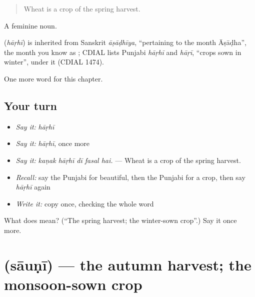 \begin{quote}
Wheat is a crop of the spring harvest.
\end{quote}

A feminine noun.

\begin{cousinweb}
\textbf{} (\emph{hāṛhī}) is inherited from Sanskrit \emph{āṣāḍhīya}, \textquotedblleft{}pertaining to the month Āṣāḍha\textquotedblright{}, the month you know as ; CDIAL lists Punjabi \emph{hāṛhī} and \emph{hāṛī}, \textquotedblleft{}crops sown in winter\textquotedblright{}, under it (CDIAL 1474).
\end{cousinweb}

\begin{grammarlens}[title={What you've built}]
One more word for this chapter.
\end{grammarlens}

\subsection*{Your turn}
\begin{itemize}
\raggedright
  \item \emph{Say it:} \emph{hāṛhī}
  \item \emph{Say it:} \emph{hāṛhī}, once more
  \item \emph{Say it:} \emph{kaṇak hāṛhī dī fasal hai.} — Wheat is a crop of the spring harvest.
  \item \emph{Recall:} say the Punjabi for beautiful, then the Punjabi for a crop, then say \emph{hāṛhī} again
  \item \emph{Write it:} copy \textbf{} once, checking the whole word
\end{itemize}

\begin{tcolorbox}[breakable,colback=teal!4,colframe=teal!35!black,title={Before you move on}]
What does  mean? (\textquotedblleft{}The spring harvest; the winter-sown crop\textquotedblright{}.) Say it once more.
\end{tcolorbox}
\section[\texorpdfstring{\pa{ਸਾਉਣੀ} (sāuṇī)}{ਸਾਉਣੀ (sāuṇī)}]{ (sāuṇī) — the autumn harvest; the monsoon-sown crop}

\label{lesson:PA-C300-sauni}



